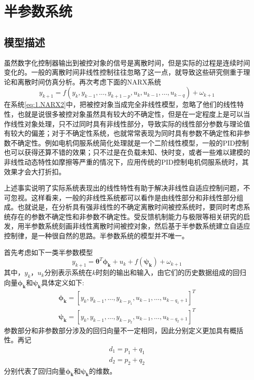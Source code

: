 \section{半参数系统}\label{sect:2.2}
\subsection{模型描述}\label{subsect:2.2.1}
虽然数字化控制器输出到被控对象的信号是离散时间，但是实际的过程是连续时间变化的。一般的离散时间非线性控制往往忽略了这一点，就导致这些研究侧重于理论和离散时间仿真分析。再次考虑下面的NARX系统
\begin{equation}%
\label{eq:1.NARX2}
y_{k+1} = f(y_{k},y_{k-1},\ldots,y_{k+1-p},u_{k},u_{k-1},\ldots,u_{k-q})+\omega_{k+1}
\end{equation}
在系统\eqref{eq:1.NARX2}中，把被控对象当成完全非线性模型，忽略了他们的线性特性，也就是说很多被控对象虽然具有较大的不确定性，但是在一定程度上是可以当作线性对象处理，只不过同时具有非线性部分，导致实际的线性部分参数与理论值有较大的偏差；对于不确定性系统，也就常常表现为同时具有参数不确定性和非参数不确定性。例如电机伺服系统简化处理就是一个二阶线性模型，一般的PID控制也可以获得还算不错的效果；只不过是在负载未知、快时变，或者一些难以建模的非线性动态特性如摩擦等严重的情况下，应用传统的PID控制电机伺服系统时，其效果才会大打折扣。

上述事实说明了实际系统表现出的线性特性有助于解决非线性自适应控制问题，不可忽视。这样看来，一般的非线性系统都可以看作是由线性部分和非线性部分组成。也就说是，在分析具有强非线性的不确定离散时间被控系统时，要同时考虑系统存在的参数不确定性和非参数不确定性。受反馈机制能力与极限等相关研究的启发，用半参数系统刻画非线性离散时间被控对象，然后基于半参数系统建立自适应控制律，是一种很自然的思路。半参数系统的模型并不唯一。

首先考虑如下一类半参数模型
\begin{equation}%
\label{eq:semi-u}
y_{k+1} = \bm{\theta}^{T}\bm{\phi_{k}}+u_{k}+f(\bm{\psi_{k}})+\omega_{k+1}
\end{equation}
其中，$y_{k}$，$u_{k}$分别表示系统在$k$时刻的输出和输入，由它们的历史数据组成的回归向量$\bm{\phi_{k}}$和$\bm{\psi_{k}}$具体定义如下:
\begin{eqnarray}
\bm{\phi_{k}}=[y_{k},y_{k-1},\ldots,y_{k-p_{1}},u_{k-1},\dots,u_{k-q_{1}+1}]^{T}\\
\bm{\psi_{k}}=[y_{k},y_{k-1},\ldots,y_{k-p_{2}},u_{k-1},\dots,u_{k-q_{2}+1}]^{T}
\end{eqnarray}
参数部分和非参数部分涉及的回归向量不一定相同，因此分别定义更加具有概括性。再记
\begin{eqnarray}
d_{1}=p_{1}+q_{1}\\
d_{2}=p_{2}+q_{2}
\end{eqnarray}
分别代表了回归向量$\bm{\phi_{k}}$和$\bm{\psi_{k}}$的维数。

